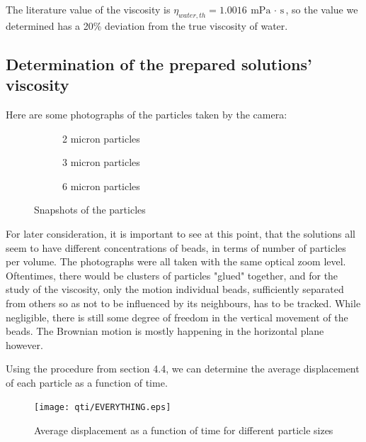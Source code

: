 \documentclass{article}
\begin{document}
The literature value of the viscosity is $\eta_{water,th}=1.0016 \ \text{mPa $\cdot$ s}$, so the value we determined has a 20\% deviation from the true viscosity of water.

\subsection{Determination of the prepared solutions' viscosity}
Here are some photographs of the particles taken by the camera:
\begin{figure}[H]
    \centering
    \begin{subfigure}{0.32\textwidth}
        \caption{2 micron particles}
        \label{2micronsnap}
    \end{subfigure}
    \begin{subfigure}{0.32\textwidth}
        \caption{3 micron particles}
        \label{3micronsnap}
    \end{subfigure}
    \begin{subfigure}{0.32\textwidth}
        \caption{6 micron particles}
        \label{6micronsnap}
    \end{subfigure}
    \caption{Snapshots of the particles}
    \label{fig:snapshots}
\end{figure}

For later consideration, it is important to see at this point, that the solutions all seem to have different concentrations of beads, in terms of number of particles per volume. The photographs were all taken with the same optical zoom level. Oftentimes, there would be clusters of particles "glued" together, and for the study of the viscosity, only the motion individual beads, sufficiently separated from others so as not to be influenced by its neighbours, has to be tracked. While negligible, there is still some degree of freedom in the vertical movement of the beads. The Brownian motion is mostly happening in the horizontal plane however. \medskip

Using the procedure from section 4.4, we can determine the average displacement of each particle as a function of time.
\begin{figure}[H]
    \centering
    \texttt{[image: qti/EVERYTHING.eps]}
    \caption{Average displacement as a function of time for different particle sizes}
    \label{fig:my_label}
\end{figure}
\end{document}
